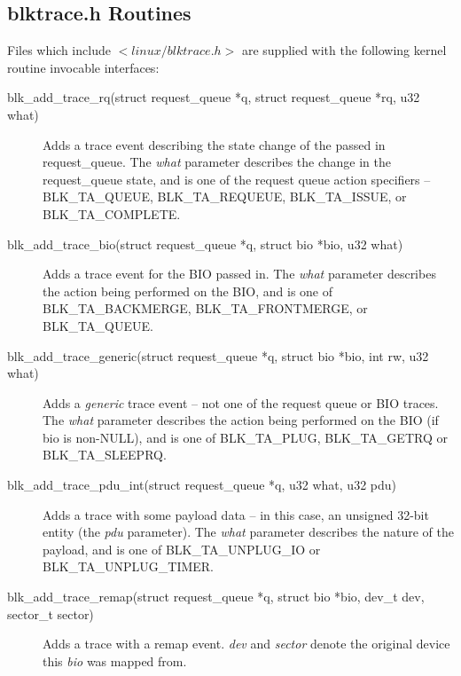 \documentclass{article}
\begin{document}
\subsection{blktrace.h Routines}
Files which include $<linux/blktrace.h>$ are supplied with the following
kernel routine invocable interfaces:

\begin{description}
  \item[blk\_add\_trace\_rq(struct request\_queue *q, struct request\_queue 
  								*rq, u32 what)]
	Adds a trace event describing the state change of the passed in
	request\_queue. The \emph{what} parameter describes the change in
	the request\_queue state, and is one of the request queue action 
	specifiers -- BLK\_TA\_QUEUE, BLK\_TA\_REQUEUE, BLK\_TA\_ISSUE,
	or BLK\_TA\_COMPLETE.

  \item[blk\_add\_trace\_bio(struct request\_queue *q, struct bio *bio, 
  								u32 what)]
	Adds a trace event for the BIO passed in. The \emph{what} parameter
	describes the action being performed on the BIO, and is one of
	BLK\_TA\_BACKMERGE, BLK\_TA\_FRONTMERGE, or BLK\_TA\_QUEUE.

  \item[blk\_add\_trace\_generic(struct request\_queue *q, struct bio *bio, 
							int rw, u32 what)]
	Adds a \emph{generic} trace event -- not one of the request queue
	or BIO traces. The \emph{what} parameter describes the action being 
	performed on the BIO (if bio is non-NULL), and is one of
	BLK\_TA\_PLUG, BLK\_TA\_GETRQ or BLK\_TA\_SLEEPRQ.

  \item[blk\_add\_trace\_pdu\_int(struct request\_queue *q, u32 what,
  								u32 pdu)]
	Adds a trace with some payload data -- in this case, an unsigned
	32-bit entity (the \emph{pdu} parameter). The \emph{what} parameter
	describes the nature of the payload, and is one of
	BLK\_TA\_UNPLUG\_IO or BLK\_TA\_UNPLUG\_TIMER.

  \item[blk\_add\_trace\_remap(struct request\_queue *q, struct bio  *bio,
						dev\_t dev, sector\_t sector)]
	Adds a trace with a remap event. \emph{dev} and \emph{sector} denote
	the original device this \emph{bio} was mapped from.


\end{description}
\end{document}

